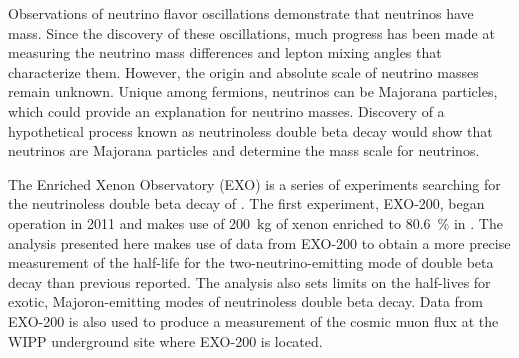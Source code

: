 Observations of neutrino flavor oscillations demonstrate that neutrinos have mass. Since the discovery of these oscillations, much progress has been made at measuring the neutrino mass differences and lepton mixing angles that characterize them. However, the origin and absolute scale of neutrino masses remain unknown. Unique among fermions, neutrinos can be Majorana particles, which could provide an explanation for neutrino masses. Discovery of a hypothetical process known as neutrinoless double beta decay would show that neutrinos are Majorana particles and determine the mass scale for neutrinos.

The Enriched Xenon Observatory (EXO) is a series of experiments searching for the neutrinoless double beta decay of . The first experiment, EXO-200, began operation in 2011 and makes use of \SI{200}{\kg} of xenon enriched to \SI{80.6}{\percent} in . The analysis presented here makes use of data from EXO-200 to obtain a more precise measurement of the half-life for the two-neutrino-emitting mode of double beta decay than previous reported. The analysis also sets limits on the half-lives for exotic, Majoron-emitting modes of neutrinoless double beta decay. Data from EXO-200 is also used to produce a measurement of the cosmic muon flux at the WIPP underground site where EXO-200 is located.
